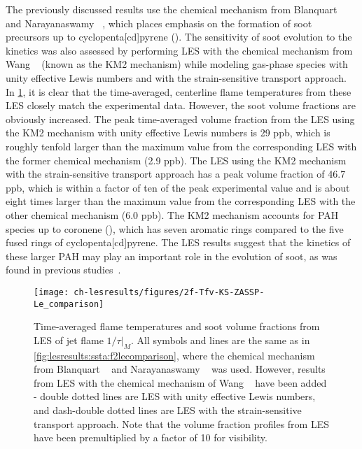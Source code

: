 The previously discussed results use the chemical mechanism from Blanquart \etal~\cite{blanquart2009} and Narayanaswamy \etal~\cite{narayanaswamy2010}, which places emphasis on the formation of soot precursors up to cyclopenta[cd]pyrene (). The sensitivity of soot evolution to the kinetics was also assessed by performing LES with the chemical mechanism from Wang \etal~\cite{wang2013} (known as the KM2 mechanism) while modeling gas-phase species with unity effective Lewis numbers and with the strain-sensitive transport approach. In \cref{fig:lesresults:ssta:f2lemechcomparison}, it is clear that the time-averaged, centerline flame temperatures from these LES closely match the experimental data. However, the soot volume fractions are obviously increased. The peak time-averaged volume fraction from the LES using the KM2 mechanism with unity effective Lewis numbers is 29 ppb, which is roughly tenfold larger than the maximum value from the corresponding LES with the former chemical mechanism (2.9 ppb). The LES using the KM2 mechanism with the strain-sensitive transport approach has a peak volume fraction of 46.7 ppb, which is within a factor of ten of the peak experimental value and is about eight times larger than the maximum value from the corresponding LES with the other chemical mechanism (6.0 ppb). The KM2 mechanism accounts for PAH species up to coronene (), which has seven aromatic rings compared to the five fused rings of cyclopenta[cd]pyrene. The LES results suggest that the kinetics of these larger PAH may play an important role in the evolution of soot, as was found in previous studies~\cite{wang2013,selvaraj2016}. 

\begin{figure}[htb]
  \centering
  \texttt{[image: ch-lesresults/figures/2f-Tfv-KS-ZASSP-Le\_comparison]}
  \caption[Centerline \texorpdfstring{$\langle T \rangle$}{<T>} \& \texorpdfstring{$\langle f_V \rangle$}{<fV>} from LES of Flame \texorpdfstring{$1/\tau|_M$}{1/t|M} with Various Transport Approaches and Chemical Mechanisms]{Time-averaged flame temperatures and soot volume fractions from LES of jet flame $1/\tau|_M$. All symbols and lines are the same as in \cref{fig:lesresults:ssta:f2lecomparison}, where the chemical mechanism from Blanquart \etal~\cite{blanquart2009} and Narayanaswamy \etal~\cite{narayanaswamy2010} was used. However, results from LES with the chemical mechanism of Wang \etal~\cite{wang2013} have been added - double dotted lines are LES with unity effective Lewis numbers, and dash-double dotted lines are LES with the strain-sensitive transport approach. Note that the volume fraction profiles from LES have been premultiplied by a factor of 10 for visibility.}
  \label{fig:lesresults:ssta:f2lemechcomparison}
\end{figure}

